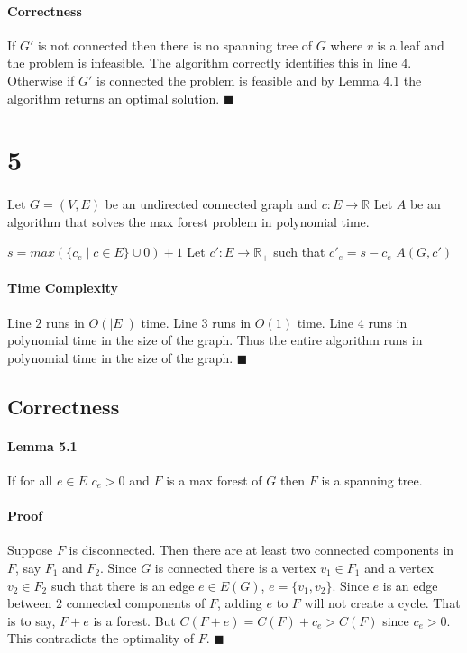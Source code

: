 \documentclass[letterpaper,12pt,oneside,onecolumn]{report}
\begin{document}
\paragraph{Correctness}
If $G'$ is not connected then there is no spanning tree of $G$ where $v$ is a leaf and the problem is infeasible. The algorithm correctly identifies this in line $4$. Otherwise if $G'$ is connected the problem is feasible and by Lemma 4.1 the algorithm returns an optimal solution. $\blacksquare$
\section*{5}
\paragraph{}
Let $G=(V,E)$ be an undirected connected graph and $c : E \rightarrow \mathbb{R}$
Let $A$ be an algorithm that solves the max forest problem in polynomial time. 
\begin{algorithm} \begin{algorithmic}[1]
\Procedure{}{}
\State $s = max(\{c_e \mid c \in E \} \cup {0}) + 1$
\State Let $c' : E \rightarrow \mathbb{R_+}$ such that $c'_e = s - c_e$
\State \Return $A(G, c')$
\EndProcedure
\end{algorithmic} \end{algorithm}
\paragraph{Time Complexity}
Line $2$ runs in $O(|E|)$ time. Line $3$ runs in $O(1)$ time. Line $4$ runs in polynomial time in the size of the graph. Thus the entire algorithm runs in polynomial time in the size of the graph. $\blacksquare$
\subsection*{Correctness}
\paragraph{Lemma 5.1}
If for all $e \in E$ $c_e > 0$ and $F$ is a max forest of $G$ then $F$ is a spanning tree.
\paragraph{Proof}
Suppose $F$ is disconnected. Then there are at least two connected components in $F$, say $F_1$ and $F_2$. Since $G$ is connected there is a vertex $v_1 \in F_1$ and a vertex $v_2 \in F_2$ such that there is an edge $e \in E(G)$, $e = \{v_1, v_2\}$. Since $e$ is an edge between 2 connected components of $F$, adding $e$ to $F$ will not create a cycle. That is to say, $F + e$ is a forest. But $C(F + e) = C(F) + c_e > C(F)$ since $c_e > 0$. This contradicts the optimality of $F$. $\blacksquare$
\end{document}
